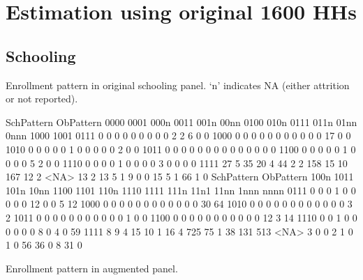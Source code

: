 \section{Estimation using original 1600 HHs}


\subsection{Schooling}




Enrollment pattern in original schooling panel. `n' indicates NA (either attrition or not reported).
\begin{Schunk}
\begin{Soutput}
         SchPattern
ObPattern 0000 0001 000n 0011 001n 00nn 0100 010n 0111 011n 01nn 0nnn 1000 1001
     0111    0    0    0    0    0    0    0    0    0    2    2    6    0    0
     1000    0    0    0    0    0    0    0    0    0    0    0   17    0    0
     1010    0    0    0    0    0    1    0    0    0    0    0    2    0    0
     1011    0    0    0    0    0    0    0    0    0    0    0    0    0    0
     1100    0    0    0    0    0    1    0    0    0    0    5    2    0    0
     1110    0    0    0    0    1    0    0    0    0    3    0    0    0    0
     1111   27    5   35   20    4   44    2    2  158   15   10  167   12    2
     <NA>   13    2   13    5    1    9    0    0   15    5    1   66    1    0
         SchPattern
ObPattern 100n 1011 101n 10nn 1100 1101 110n 1110 1111 111n 11n1 11nn 1nnn nnnn
     0111    0    0    0    1    0    0    0    0    0   12    0    0    5   12
     1000    0    0    0    0    0    0    0    0    0    0    0    0   30   64
     1010    0    0    0    0    0    0    0    0    0    0    0    0    3    2
     1011    0    0    0    0    0    0    0    0    0    0    0    1    0    0
     1100    0    0    0    0    0    0    0    0    0    0    0   12    3   14
     1110    0    0    1    0    0    0    0    0    0    8    0    4    0   59
     1111    8    9    4   15   10    1   16    4  725   75    1   38  131  513
     <NA>    3    0    0    2    1    0    1    0   56   36    0    8   31    0
\end{Soutput}
\end{Schunk}
Enrollment pattern in augmented panel.
